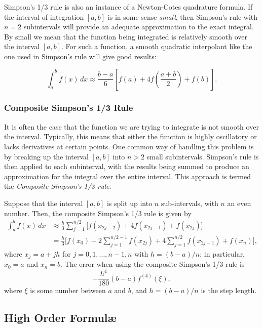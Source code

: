 Simpson's 1/3 rule is also an instance of a Newton-Cotes quadrature formula.
If the interval of integration $[a, b]$ is in some sense \emph{small},
then Simpson's rule with $n = 2$ subintervals will provide an
adequate approximation to the exact integral. By small we mean that
the function being integrated is relatively smooth over the interval
$[a, b]$. For such a function, a smooth quadratic interpolant like
the one used in Simpson's rule will give good results:

$$
\int_a^b f(x) \, dx \approx \frac{b - a}{6} \left[f(a) + 4f\left(\frac{a + b}{2}\right) + f(b)\right].
$$

\subsubsection{Composite Simpson's 1/3 Rule}\label{section:compositesimpson}

It is often the case that the function we are trying to integrate is not smooth
over the interval. Typically, this means that either the function is highly
oscillatory or lacks derivatives at certain points. One common way of handling
this problem is by breaking up the interval $[a, b]$ into $n > 2$ small
subintervals. Simpson's rule is then applied to each subinterval, with the
results being summed to produce an approximation for the integral over the
entire interval. This approach is termed the \emph{Composite Simpson's 1/3
rule}.

Suppose that the interval $[a, b]$ is split up into $n$ sub-intervals,
with $n$ an even number. Then, the composite Simpson's 1/3 rule is given by
\begin{align*}
  \int_a^b f(x) \, dx &\approx \frac{h}{3}
   \sum_{j=1}^{n/2}\big[f(x_{2j-2}) + 4f(x_{2j-1}) + f(x_{2j})\big] \\
  &= \frac{h}{3}
   \bigg[f(x_0) + 2\sum_{j=1}^{n/2-1} f(x_{2j}) + 4\sum_{j=1}^{n/2} f(x_{2j-1}) + f(x_n)\bigg],
 \end{align*}
where $x_j = a + jh$ for $j = 0, 1, \dots, n - 1, n$ with $h = (b -
a)/n$; in particular, $x_0 = a$ and $x_n = b$. The error when using the
composite Simpson's 1/3 rule is
$$
-\frac{h^4}{180} (b - a)f^{(4)}(\xi),
$$
where $\xi$ is some number between $a$ and $b$, and $h = (b - a)/n$ is
the step length.

\subsection{High Order Formul\ae}

